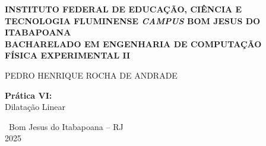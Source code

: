 \begin{center}
\thispagestyle{empty} 



    \vspace*{0.2cm}
    
    {\normalsize\bfseries INSTITUTO FEDERAL DE EDUCAÇÃO, CIÊNCIA E TECNOLOGIA FLUMINENSE \textit{CAMPUS} BOM JESUS DO ITABAPOANA \\ BACHARELADO EM ENGENHARIA DE COMPUTAÇÃO \\ FÍSICA EXPERIMENTAL II}

    \vspace{3cm}

    {\normalsize PEDRO HENRIQUE ROCHA DE ANDRADE}

    \vspace{7cm}

    {\Large\bfseries Prática VI: \\}
    {\normalsize Dilatação Linear}

    \vspace{4cm}


    \vspace{4cm}

    {\normalsize\ Bom Jesus do Itabapoana -- RJ \\
    2025}

\end{center}
